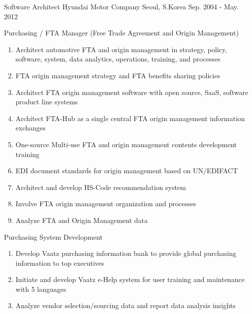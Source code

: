 

\begin{cventries}

  \cventry
    {Software Architect} %
    {Hyundai Motor Company} %
    {Seoul, S.Korea} %
    {Sep. 2004 - May. 2012} %
    {
      \begin{cvitems} %
        \item {Purchasing / FTA Manager (Free Trade Agreement and Origin Management)}
        \begin{enumerate}
          \item {Architect automotive FTA and origin management in strategy, policy, software, system, data analytics, operations, training, and processes}
          \item {FTA origin management strategy and FTA benefits sharing policies}
          \item {Architect FTA origin management software with open source, SaaS, software product line systems}
          \item {Architect FTA-Hub as a single central FTA origin management information exchanges}
          \item {One-source Multi-use FTA and origin management contents development  training}
          \item {EDI document standards for origin management based on UN/EDIFACT}
          \item {Architect and develop HS-Code recommendation system}
          \item {Involve FTA origin management organization and processes}
          \item {Analyze FTA and Origin Management data}
        \end{enumerate}  
        \item {Purchasing System Development}
        \begin{enumerate}
          \item {Develop Vaatz purchasing information bank to provide global purchasing information to top executives}
          \item {Initiate and develop Vaatz e-Help system for user training and maintenance with 5 languages}
          \item {Analyze vendor selection/sourcing data and report data analysis insights}
        \end{enumerate}
      \end{cvitems}
    }



\end{cventries}
